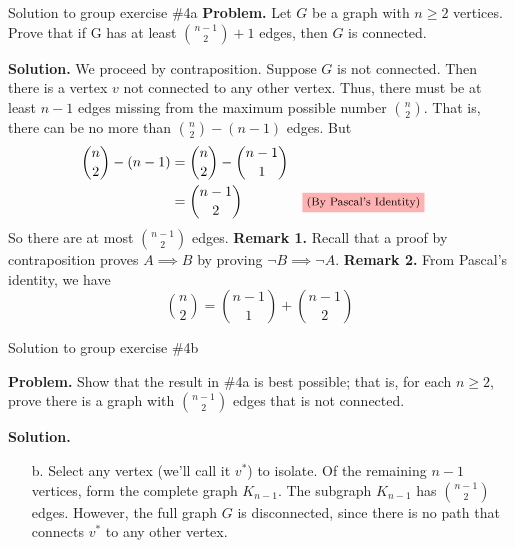 \documentclass[10pt]{beamer}
\begin{document}
\begin{frame}{Solution to group exercise \#4a}
\small 
\textbf{Problem.} Let $G$ be a graph with $n \geq 2$ vertices.   Prove that if G has at least $\binom{n-1}{2} +1$ edges, then $G$ is connected.
\vfill 

\textbf{Solution.}
 We proceed \colorbox{green!30}{by contraposition}.  Suppose $G$ is not connected. Then there is a vertex $v$ not connected to any other vertex.  Thus, there must be at least $n-1$ edges missing from the maximum possible number $\binom{n}{2}$.  That is, there can be no more than $\binom{n}{2} - (n-1)$ edges.  But
    \begin{align*}
    \binom{n}{2} - (n-1) &= 	 \binom{n}{2} -   \binom{n-1}{1} \\
    &= \binom{n-1}{2} && \text{\colorbox{red!30}{\footnotesize{(By Pascal's Identity)}}}
    \end{align*}
    So there are at most $\binom{n-1}{2}$ edges.
\vfill 
\colorbox{green!30}{\textbf{Remark 1.}} Recall that a \colorbox{green!30}{proof by contraposition} proves $A \implies B$ by proving $\lnot B \implies \lnot A$.
\vfill 
\colorbox{red!30}{\textbf{Remark 2.}} From \colorbox{red!30}{Pascal's identity}, we have
\[\binom{n}{2} = \binom{n-1}{1}  + \binom{n-1}{2}  \]
\end{frame}

\begin{frame}{Solution to group exercise \#4b}

\textbf{Problem.} Show that the result in \#4a is best possible; that is, for each $n \geq 2$, prove there is a graph with 	$\binom{n-1}{2}$ edges that is not connected.
\vfill 

\textbf{Solution.}
    \begin{itemize}
        \item[b.] Select any vertex (we'll call it $v^*$) to isolate.  Of the remaining $n-1$ vertices, form the complete graph $K_{n-1}$.  The subgraph $K_{n-1}$ has $\binom{n-1}{2}$ edges.  However, the full graph $G$ is disconnected, since there is no path that connects $v^*$ to any other vertex.  
    \end{itemize}
\end{frame}
\end{document}
